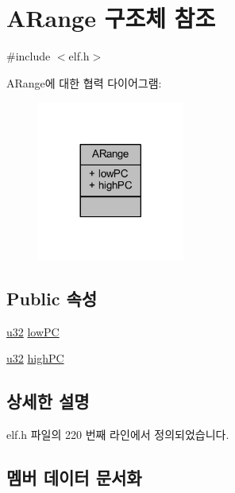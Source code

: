 \hypertarget{struct_a_range}{}\section{A\+Range 구조체 참조}
\label{struct_a_range}


{\ttfamily \#include $<$elf.\+h$>$}



A\+Range에 대한 협력 다이어그램\+:\nopagebreak
\begin{figure}[H]
\begin{center}
\leavevmode
\includegraphics[width=137pt]{struct_a_range__coll__graph}
\end{center}
\end{figure}
\subsection*{Public 속성}
\begin{DoxyCompactItemize}
\item 
\mbox{\hyperlink{_system_8h_a10e94b422ef0c20dcdec20d31a1f5049}{u32}} \mbox{\hyperlink{struct_a_range_a967436344fa630513a70d3fadb4c3bbe}{low\+PC}}
\item 
\mbox{\hyperlink{_system_8h_a10e94b422ef0c20dcdec20d31a1f5049}{u32}} \mbox{\hyperlink{struct_a_range_aa1c1290004480b58c3fb5133e5e00430}{high\+PC}}
\end{DoxyCompactItemize}


\subsection{상세한 설명}


elf.\+h 파일의 220 번째 라인에서 정의되었습니다.



\subsection{멤버 데이터 문서화}
\mbox{\label{struct_a_range_aa1c1290004480b58c3fb5133e5e00430}} 
